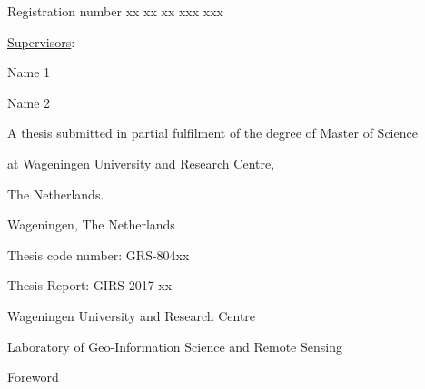 \documentclass[a4paper,12pt]{book} %
\begin{document}
\begin{titlingpage}
\begin{center}
  {Registration number xx xx xx xxx xxx}\vspace{3.5cm}
  
  {\large \underline{Supervisors}:}\vspace{1.1cm}
  
  {Name 1}
  
  {Name 2}\vspace{3.0cm}
  
  {A thesis submitted in partial fulfilment of the degree of Master of Science}
  
  {at Wageningen University and Research Centre,}
  
  {The Netherlands.}\vspace{2.7cm}
  \end{center}
  
  \begin{flushright}
    {\thedate}
  
    {Wageningen, The Netherlands}
  \end{flushright}\vspace{0.5cm}

    Thesis code number: GRS-804xx
  
    Thesis Report: GIRS-2017-xx
  
    {Wageningen University and Research Centre}
  
    {Laboratory of Geo-Information Science and Remote Sensing}
 \end{titlingpage}
 
 Foreword
\end{document}
